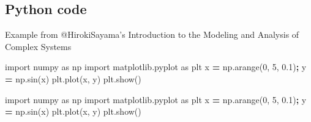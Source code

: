 \documentclass[]{article}
\newenvironment{Shaded}{\begin{snugshade}}{\end{snugshade}}
\newcommand{\DecValTok}[1]{\textcolor[rgb]{0.00,0.00,0.81}{#1}}
\newcommand{\FloatTok}[1]{\textcolor[rgb]{0.00,0.00,0.81}{#1}}
\newcommand{\ImportTok}[1]{#1}
\newcommand{\OperatorTok}[1]{\textcolor[rgb]{0.81,0.36,0.00}{\textbf{#1}}}
\newcommand{\NormalTok}[1]{#1}
\begin{document}
\subsection{Python code}\label{python-code}

Example from @HirokiSayama's Introduction to the Modeling and Analysis
of Complex Systems

\begin{Shaded}
\begin{Highlighting}[]
\ImportTok{import}\NormalTok{ numpy }\ImportTok{as}\NormalTok{ np }
\ImportTok{import}\NormalTok{ matplotlib.pyplot }\ImportTok{as}\NormalTok{ plt}
\NormalTok{x }\OperatorTok{=}\NormalTok{ np.arange(}\DecValTok{0}\NormalTok{, }\DecValTok{5}\NormalTok{, }\FloatTok{0.1}\NormalTok{)}\OperatorTok{;} 
\NormalTok{y }\OperatorTok{=}\NormalTok{ np.sin(x) }
\NormalTok{plt.plot(x, y) }
\NormalTok{plt.show()}
\end{Highlighting}
\end{Shaded}

\begin{Shaded}
\begin{Highlighting}[]
\ImportTok{import}\NormalTok{ numpy }\ImportTok{as}\NormalTok{ np }
\ImportTok{import}\NormalTok{ matplotlib.pyplot }\ImportTok{as}\NormalTok{ plt}
\NormalTok{x }\OperatorTok{=}\NormalTok{ np.arange(}\DecValTok{0}\NormalTok{, }\DecValTok{5}\NormalTok{, }\FloatTok{0.1}\NormalTok{)}\OperatorTok{;} 
\NormalTok{y }\OperatorTok{=}\NormalTok{ np.sin(x) }
\NormalTok{plt.plot(x, y) }
\NormalTok{plt.show()}
\end{Highlighting}
\end{Shaded}
\end{document}
